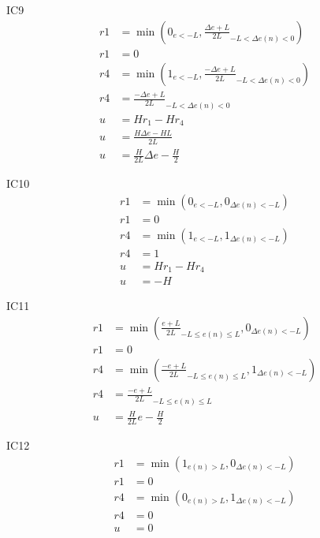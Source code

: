 IC9
\begin{equation}
\begin{split}
    r1&=\min{\left(0_{e<-L},\frac{\Delta e+L}{2L}_{-L<\Delta e(n)<0}\right)}\\
    r1&=0\\
    r4&=\min{\left(1_{e<-L},\frac{-\Delta e+L}{2L}_{-L<\Delta e(n)<0}\right)}\\
    r4&=\frac{-\Delta e+L}{2L}_{-L<\Delta e(n)<0}\\
    u&=Hr_1-Hr_4\\
    u&=\frac{H\Delta e-HL}{2L}\\
    u&=\frac{H}{2L}\Delta e-\frac{H}{2}
\end{split}
\end{equation}

IC10
\begin{equation}
\begin{split}
    r1&=\min{\left(0_{e<-L},0_{\Delta e(n)<-L}\right)}\\
    r1&=0\\
    r4&=\min{\left(1_{e<-L},1_{\Delta e(n)<-L}\right)}\\
    r4&=1\\
    u&=Hr_1-Hr_4\\
    u&=-H
\end{split}
\end{equation}

IC11
\begin{equation}
\begin{split}
    r1&=\min{\left(\frac{e+L}{2L}_{-L\leq e(n)\leq L},0_{\Delta e(n)<-L}\right)}\\
    r1&=0\\
    r4&=\min{\left(\frac{-e+L}{2L}_{-L\leq e(n)\leq L},1_{\Delta e(n)<-L}\right)}\\
    r4&=\frac{-e+L}{2L}_{-L\leq e(n)\leq L}\\
    u&=\frac{H}{2L}e-\frac{H}{2}
\end{split}
\end{equation}

IC12
\begin{equation}
\begin{split}
    r1&=\min{\left(1_{e(n)>L},0_{\Delta e(n)<-L}\right)}\\
    r1&=0\\
    r4&=\min{\left(0_{e(n)>L},1_{\Delta e(n)<-L}\right)}\\
    r4&=0\\
    u&=0
\end{split}
\end{equation}



